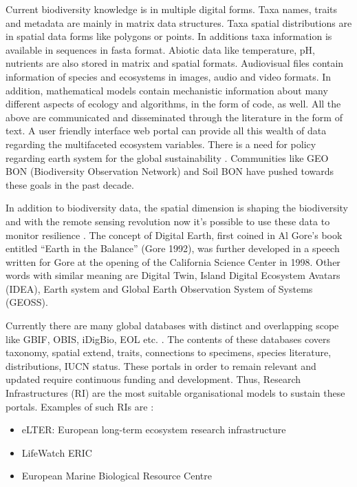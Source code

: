 Current biodiversity knowledge is in multiple digital forms. 
Taxa names, traits and metadata are mainly in matrix data
structures. Taxa spatial distributions are in spatial data
forms like polygons or points. In additions taxa information
is available in sequences in fasta format. Abiotic data like 
temperature, pH, nutrients are also stored in matrix
and spatial formats. Audiovisual files contain information
of species and ecosystems in images, audio and video formats.
In addition, mathematical models contain mechanistic information
about many different aspects of ecology and algorithms, in the 
form of code, as well. All the above are communicated and disseminated through the
literature in the form of text. A user friendly interface web portal can provide all this wealth of data
regarding the multifaceted ecosystem variables. There is a need for policy regarding earth system for the global
sustainability \parencite{reid2010earth}. Communities like GEO BON (Biodiversity Observation Network) and Soil BON
have pushed towards these goals in the past decade.

In addition to biodiversity data, the spatial dimension is shaping the biodiversity and with the remote sensing revolution now
it's possible to use these data to monitor resilience \parencite{Lenton2022resilience}. 
The concept of Digital Earth, first coined in Al Gore’s book entitled 
“Earth in the Balance” (Gore 1992), was further developed in a speech
written for Gore at the opening of the California Science Center in 1998. Other words with
similar meaning are Digital Twin, Island Digital Ecosystem Avatars (IDEA), Earth system
and Global Earth Observation System of Systems (GEOSS).

Currently there are many global databases with distinct and overlapping 
scope like GBIF, OBIS, iDigBio, EOL etc. \parencite{feng2022Review}. 
The contents of these databases covers taxonomy, spatial extend, traits, 
connections to specimens, species literature, distributions,
IUCN status. These portals in order to remain relevant and updated require 
continuous funding and development. Thus, Research Infrastructures (RI) are 
the most suitable organisational models to sustain these portals. Examples 
of such RIs are :

\begin{itemize}

    \item eLTER: European long-term ecosystem research infrastructure 
    \item LifeWatch ERIC
    \item European Marine Biological Resource Centre

\end{itemize}

